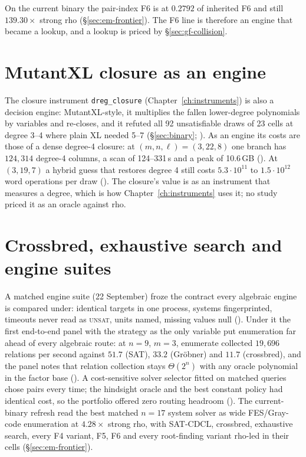 On the current binary the pair-index F6 is at $0.2792$ of inherited F6 and
still $139.30\times$ strong rho (\S\ref{sec:em-frontier}). The F6 line is
therefore an engine that became a lookup, and a lookup is priced by
\S\ref{sec:gf-collision}.

\section{MutantXL closure as an engine}\label{sec:bo-mutantxl}

The closure instrument \texttt{dreg\_closure} (Chapter~\ref{ch:instruments})
is also a decision engine: MutantXL-style, it multiplies the fallen
lower-degree polynomials by variables and re-closes, and it refuted all 92
unsatisfiable draws of 23 cells at degree 3--4 where plain XL needed 5--7
(\S\ref{sec:binary}; ).
As an engine its costs are those of a dense degree-4 closure: at
$(m,n,\ell)=(3,22,8)$ one branch has $124{,}314$ degree-4 columns, a scan
of 124--331\,s and a peak of 10.6\,GB
(). At $(3,19,7)$ a
hybrid guess that restores degree 4 still costs $5.3\cdot10^{11}$ to
$1.5\cdot10^{12}$ word operations per draw
(). The closure's value
is as an instrument that measures a degree, which is how
Chapter~\ref{ch:instruments} uses it; no study priced it as an oracle against
rho.

\section{Crossbred, exhaustive search and engine suites}\label{sec:bo-suites}

A matched engine suite (22 September) froze the contract every algebraic
engine is compared under: identical targets in one process, systems
fingerprinted, timeouts never read as \textsc{unsat}, units named, missing
values null (). Under
it the first end-to-end panel with the strategy as the only variable put
enumeration far ahead of every algebraic route: at $n=9$, $m=3$, enumerate
collected $19{,}696$ relations per second against $51.7$ (SAT), $33.2$
(Gr\"obner) and $11.7$ (crossbred), and the panel notes that relation
collection stays $\Theta(2^n)$ with any oracle polynomial in the factor base
(). A cost-sensitive solver
selector fitted on matched queries chose pairs every time; the hindsight
oracle and the best constant policy had identical cost, so the portfolio
offered zero routing headroom ().
The current-binary refresh read the best matched $n=17$ system solver as wide
FES/Gray-code enumeration at $4.28\times$ strong rho, with SAT-CDCL,
crossbred, exhaustive search, every F4 variant, F5, F6 and every
root-finding variant rho-led in their cells (\S\ref{sec:em-frontier}).

